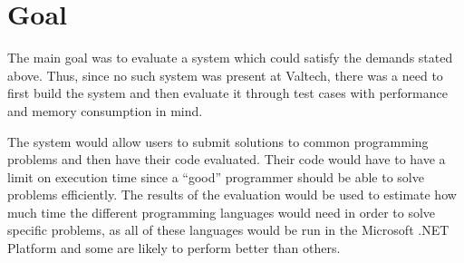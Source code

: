 \section{Goal}
The main goal was to evaluate a system which could satisfy the demands stated above. Thus, since no such system was present at Valtech, there was a need to first build the system and then evaluate it through test cases with performance and memory consumption in mind. 

The system would allow users to submit solutions to common programming problems and then have their code evaluated. Their code would have to have a limit on execution time since a ``good'' programmer should be able to solve problems efficiently. The results of the evaluation would be used to estimate how much time the different programming languages would need in order to solve specific problems, as all of these languages would be run in the Microsoft .NET Platform and some are likely to perform better than others.